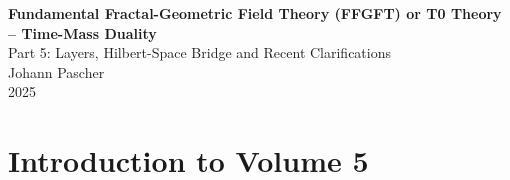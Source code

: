 



	
	\setcounter{section}{0}
	\setcounter{subsection}{0}
	\setcounter{subsubsection}{0}
	\setcounter{paragraph}{0}
	
	\setcounter{secnumdepth}{1}  %
	\makeatletter
	\renewcommand*\l@part[2]{%
		\ifnum \c@tocdepth >-2\relax
		\addpenalty{-\@highpenalty}%
		\addvspace{0.8em \@plus\p@}%
		{\leftskip 0em \relax
			\rightskip \@tocrmarg
			\parfillskip -\rightskip
			\parindent 0em \relax\@afterindenttrue
			\interlinepenalty\@M
			\leavevmode
			{\footnotesize\bfseries #1}\nobreak
			\leaders\hbox{$\m@th\mkern \@dotsep mu\hbox{}\mkern \@dotsep mu$}\hfill
			\nobreak\hb@xt@\@pnumwidth{\hss #2}\par}%
		\addvspace{0.2em \@plus\p@}%
		\nobreak
		\fi}
	\makeatother
	
	\renewcommand{\cftchapfont}{\footnotesize\bfseries}
	\renewcommand{\cftchappagefont}{\footnotesize\bfseries}
	\setlength{\cftbeforechapskip}{0.3em}
	
	\setcounter{tocdepth}{0}
	\begin{titlepage}
		\centering
		\vspace*{2cm}
		
    {\Huge\textbf{Fundamental Fractal-Geometric Field Theory (FFGFT) or T0 Theory – Time-Mass Duality}}\\[1cm]
    {\Large Part 5: Layers, Hilbert-Space Bridge and Recent Clarifications}\\[2cm]
		
		
		{\large Johann Pascher}\\[1cm]
		
		{\large 2025}
		
		\vfill
	\end{titlepage}
	
	\frontmatter
	\pagestyle{fancy}
	\makeatletter
	\let\ps@plain\ps@fancy
	\let\ps@empty\ps@fancy
	\makeatother
	
		\mainmatter
	\chapter{Introduction to Volume 5}
	
	
